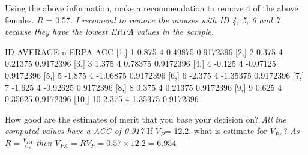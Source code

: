 \documentclass[12pt,a4paper]{paper}
\begin{document}
\begin{enumerate}
\begin{center}
\begin{tabular}{|r||c|c|c|c|c|c|c|c|c|c|}
\hline
\end{tabular}
\end{center}
Using the above information, make a recommendation to remove 4 of the above females. $R$ = 0.57. \textit{I recomend to remove the mouses with ID 4, 5, 6 and 7 because they have the lowest ERPA values in the sample.}
\begin{Schunk}
\begin{Soutput}
      ID AVERAGE n     ERPA       ACC
 [1,]  1   0.875 4  0.49875 0.9172396
 [2,]  2   0.375 4  0.21375 0.9172396
 [3,]  3   1.375 4  0.78375 0.9172396
 [4,]  4  -0.125 4 -0.07125 0.9172396
 [5,]  5  -1.875 4 -1.06875 0.9172396
 [6,]  6  -2.375 4 -1.35375 0.9172396
 [7,]  7  -1.625 4 -0.92625 0.9172396
 [8,]  8   0.375 4  0.21375 0.9172396
 [9,]  9   0.625 4  0.35625 0.9172396
[10,] 10   2.375 4  1.35375 0.9172396
\end{Soutput}
\end{Schunk}
How good are the estimates of merit that you base your decision on? \textit{All the computed values have a ACC of 0.917} If $V_{P}$= 12.2, what is estimate for $V_{PA}$? \textit{As $R = \frac{V_{PA}}{V_{P}}$ then $V_{PA} = RV_{P} = 0.57 \times 12.2 = 6.954$ }



\end{enumerate}
\end{document}
